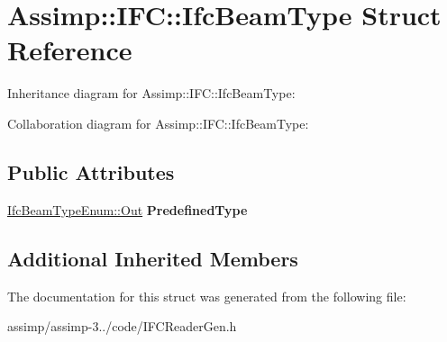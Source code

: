 \hypertarget{struct_assimp_1_1_i_f_c_1_1_ifc_beam_type}{\section{Assimp\+:\+:I\+F\+C\+:\+:Ifc\+Beam\+Type Struct Reference}
\label{struct_assimp_1_1_i_f_c_1_1_ifc_beam_type}
}


Inheritance diagram for Assimp\+:\+:I\+F\+C\+:\+:Ifc\+Beam\+Type\+:


Collaboration diagram for Assimp\+:\+:I\+F\+C\+:\+:Ifc\+Beam\+Type\+:
\subsection*{Public Attributes}
\begin{DoxyCompactItemize}
\item 
\hypertarget{struct_assimp_1_1_i_f_c_1_1_ifc_beam_type_ab3f7b3dd1ecccc2a86b9c6df6bbd0f3b}{\hyperlink{classboost_1_1shared__ptr}{Ifc\+Beam\+Type\+Enum\+::\+Out} {\bfseries Predefined\+Type}}\label{struct_assimp_1_1_i_f_c_1_1_ifc_beam_type_ab3f7b3dd1ecccc2a86b9c6df6bbd0f3b}

\end{DoxyCompactItemize}
\subsection*{Additional Inherited Members}


The documentation for this struct was generated from the following file\+:\begin{DoxyCompactItemize}
\item 
assimp/assimp-\/3../code/I\+F\+C\+Reader\+Gen.\+h\end{DoxyCompactItemize}

